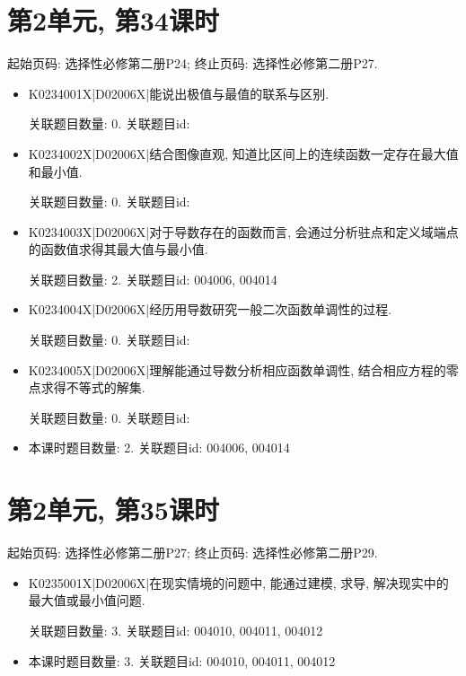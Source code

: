 \section*{第2单元, 第34课时}
起始页码: 选择性必修第二册P24; 终止页码: 选择性必修第二册P27.
\begin{itemize}
\item K0234001X|D02006X|能说出极值与最值的联系与区别.

关联题目数量: 0. 关联题目id: 

\item K0234002X|D02006X|结合图像直观, 知道比区间上的连续函数一定存在最大值和最小值.

关联题目数量: 0. 关联题目id: 

\item K0234003X|D02006X|对于导数存在的函数而言, 会通过分析驻点和定义域端点的函数值求得其最大值与最小值.

关联题目数量: 2. 关联题目id: 004006, 004014

\item K0234004X|D02006X|经历用导数研究一般二次函数单调性的过程.

关联题目数量: 0. 关联题目id: 

\item K0234005X|D02006X|理解能通过导数分析相应函数单调性, 结合相应方程的零点求得不等式的解集.

关联题目数量: 0. 关联题目id: 

\item 本课时题目数量: 2. 关联题目id: 004006, 004014

\end{itemize}

\section*{第2单元, 第35课时}
起始页码: 选择性必修第二册P27; 终止页码: 选择性必修第二册P29.
\begin{itemize}
\item K0235001X|D02006X|在现实情境的问题中, 能通过建模, 求导, 解决现实中的最大值或最小值问题.

关联题目数量: 3. 关联题目id: 004010, 004011, 004012

\item 本课时题目数量: 3. 关联题目id: 004010, 004011, 004012

\end{itemize}

